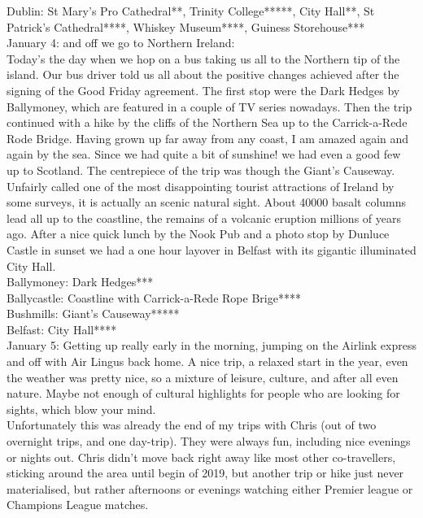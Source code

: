 Dublin: St Mary's Pro Cathedral**, Trinity College*****, City Hall**, St Patrick's Cathedral****, Whiskey Museum****, Guiness Storehouse***\\

January 4: and off we go to Northern Ireland:\\
Today's the day when we hop on a bus taking us all to the Northern tip of the island. Our bus driver told us all about the positive changes achieved after the signing of the Good Friday agreement. The first stop were the Dark Hedges by Ballymoney, which are featured in a couple of TV series nowadays. Then the trip continued with a hike by the cliffs of the Northern Sea up to the Carrick-a-Rede Rode Bridge. Having grown up far away from any coast, I am amazed again and again by the sea. Since we had quite a bit of sunshine! we had even a good few up to Scotland. The centrepiece of the trip was though the Giant's Causeway. Unfairly called one of the most disappointing tourist attractions of Ireland by some surveys, it is actually an scenic natural sight. About 40000 basalt columns lead all up to the coastline, the remains of a volcanic eruption millions of years ago. After a nice quick lunch by the Nook Pub and a photo stop by Dunluce Castle in sunset we had a one hour layover in Belfast with its gigantic illuminated City Hall.\\

Ballymoney: Dark Hedges***\\
Ballycastle: Coastline with Carrick-a-Rede Rope Brige****\\
Bushmills: Giant's Causeway*****\\
Belfast: City Hall****\\

January 5: 
Getting up really early in the morning, jumping on the Airlink express and off with Air Lingus back home. A nice trip, a relaxed start in the year, even the weather was pretty nice, so a mixture of leisure, culture, and after all even nature. Maybe not enough of cultural highlights for people who are looking for sights, which blow your mind.\\

Unfortunately this was already the end of my trips with Chris (out of two overnight trips, and one day-trip). They were always fun, including nice evenings or nights out. Chris didn't move back right away like most other co-travellers, sticking around the area until begin of 2019, but another trip or hike just never materialised, but rather afternoons or evenings watching either Premier league or Champions League matches.

